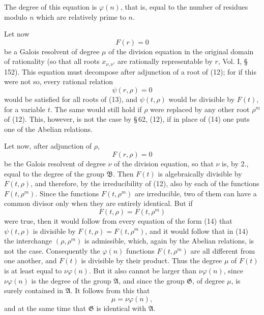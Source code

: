 \documentclass[11pt]{article}
\begin{document}
The degree of this equation is $\varphi(n)$, that is, equal to the number of residues
modulo $n$ which are relatively prime to $n$.

Let now
\begin{equation}
 F(r)=0
\tag{13}
\end{equation}
be a Galois resolvent of degree $\mu$ of the division equation in the original domain of
rationality (so that all roots $x_{\nu,\nu'}$ are rationally representable by $r$, Vol. I,
\S\,152). This equation must decompose after adjunction of a root of (12); for if this were
not so, every rational relation
\begin{equation}
 \psi(r,\rho)=0
\tag{14}
\end{equation}
would be satisfied for all roots of (13), and $\psi(t,\rho)$ would be divisible by $F(t)$,
for a variable $t$. The same would still hold if $\rho$ were replaced by any other root
$\rho^m$ of (12). This, however, is not the case by \S\,62, (12), if in place of (14) one
puts one of the Abelian relations.

Let now, after adjunction of $\rho$,
\begin{equation}
 F(r,\rho)=0
\tag{15}
\end{equation}
be the Galois resolvent of degree $\nu$ of the division equation, so that $\nu$ is, by 2.,
equal to the degree of the group $\mathfrak B$. Then $F(t)$ is algebraically divisible by
$F(t,\rho)$, and therefore, by the irreducibility of (12), also by each of the functions
$F(t,\rho^m)$. Since the functions $F(t,\rho^m)$ are irreducible, two of them can have a
common divisor only when they are entirely identical. But if
\[
 F(t,\rho)=F(t,\rho^m)
\]
were true, then it would follow from every equation of the form (14) that $\psi(t,\rho)$ is
divisible by $F(t,\rho)=F(t,\rho^m)$, and it would follow that in (14) the interchange
$(\rho,\rho^m)$ is admissible, which, again by the Abelian relations, is not the case.
Consequently the $\varphi(n)$ functions $F(t,\rho^m)$ are all different from one another, and
$F(t)$ is divisible by their product. Thus the degree $\mu$ of $F(t)$ is at least equal to
$\nu\varphi(n)$. But it also cannot be larger than $\nu\varphi(n)$, since $\nu\varphi(n)$ is the
degree of the group $\mathfrak A$, and since the group $\mathfrak G$, of degree $\mu$, is surely
contained in $\mathfrak A$. It follows from this that
\begin{equation}
 \mu=\nu\varphi(n),
\tag{16}
\end{equation}
and at the same time that $\mathfrak G$ is identical with $\mathfrak A$.
\end{document}
